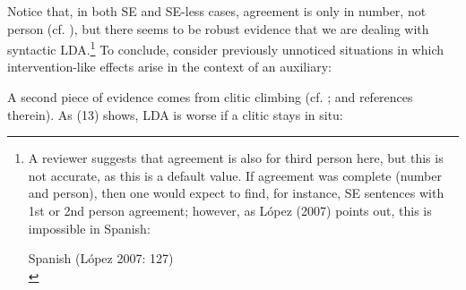 \documentclass[output=paper]{langsci/langscibook}
\begin{document}
Notice that, in both SE and SE-less cases, agreement is only in number, not person (cf. \citealt{Etxepare2005}), but there seems to be robust evidence that we are dealing with syntactic LDA.\footnote{%
    A reviewer suggests that agreement is also for third person here, but this is not accurate, as this is a default value. If agreement was complete (number and person), then one would expect to find, for instance, SE sentences with 1st or 2nd person agreement; however, as López (2007) points out, this is impossible in Spanish:
    
    \ea Spanish (López 2007: 127)\\
    \z
    \z{}} 
To conclude, consider previously unnoticed situations in which intervention-like effects arise in the context of an auxiliary: 

\ea%
    \label{ex:key:12}
    \z
\z

A second piece of evidence comes from clitic climbing (cf. \citealt{Gallego2016,Paradís 2016}; and references therein). As (13) shows, LDA is worse if a clitic stays in situ:
\end{document}
